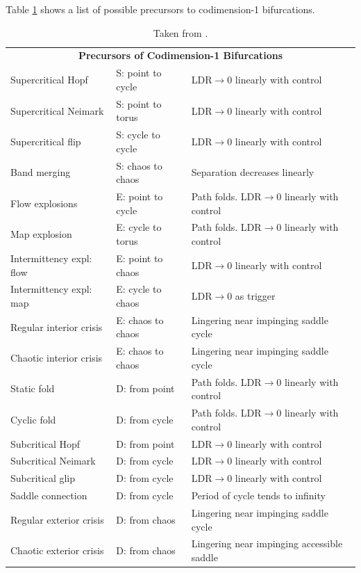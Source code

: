 Table \ref{tab:codim_1_prec} shows a list of possible precursors to  codimension-1 bifurcations. 

\begin{table}[H]
				\centering
	\begin{tabular}{lll}
		\hline
		\multicolumn{3}{c}{\textbf{Precursors of Codimension-1 Bifurcations }} \\
		Supercritical Hopf & S: point to cycle & LDR$\rightarrow 0$ linearly with control \\
		Supercritical Neimark & S: point to torus & LDR$\rightarrow 0$ linearly with control \\
		Supercritical flip & S: cycle to cycle & LDR$\rightarrow 0$ linearly with control \\
		Band merging & S: chaos to chaos & Separation decreases linearly \\
		Flow explosions & E: point to cycle & Path folds. LDR$\rightarrow 0$ linearly with control \\
		Map explosion & E: cycle to torus & Path folds. LDR$\rightarrow 0$ linearly with control \\
		Intermittency expl: flow & E: point to chaos & LDR$\rightarrow 0$ linearly with control \\
		Intermittency expl: map & E: cycle to chaos & LDR$\rightarrow 0$ as trigger \\
		Regular interior crisis & E: chaos to chaos & Lingering near impinging saddle cycle \\
		Chaotic interior crisis & E: chaos to chaos & Lingering near impinging saddle cycle \\
		Static fold & D: from point & Path folds. LDR$\rightarrow 0$ linearly with control  \\
		Cyclic fold & D: from cycle & Path folds. LDR$\rightarrow 0$ linearly with control \\
		Subcritical Hopf & D: from point & LDR$\rightarrow 0$ linearly with control \\
		Subcritical Neimark & D: from cycle & LDR$\rightarrow 0$ linearly with control \\
		Subcritical glip & D: from cycle & LDR$\rightarrow 0$ linearly with control \\
		Saddle connection & D: from cycle & Period of cycle tends to infinity \\
		Regular exterior crisis & D: from chaos & Lingering near impinging saddle cycle \\
		Chaotic exterior crisis & D: from chaos & Lingering near impinging accessible saddle \\
		\hline
	\end{tabular}
	\caption{Taken from \cite{Thompson2011a}.  }
	\label{tab:codim_1_prec}
\end{table}

